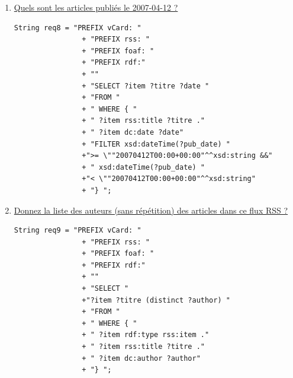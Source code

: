 \documentclass[12pt,a4paper]{article}
\begin{document}
\begin{justify}
\begin{enumerate}
            \item \underline{Quels sont les articles publiés le 2007-04-12 ?}
            \begin{verbatim}
String req8 = "PREFIX vCard: "
                + "PREFIX rss: "
                + "PREFIX foaf: "
                + "PREFIX rdf:"
                + ""
                + "SELECT ?item ?titre ?date "
                + "FROM "
                + " WHERE { "
                + " ?item rss:title ?titre ."
                + " ?item dc:date ?date"
                + "FILTER xsd:dateTime(?pub_date) "
                +">= \""20070412T00:00+00:00"^^xsd:string &&"
                + " xsd:dateTime(?pub_date) "
                +"< \""20070412T00:00+00:00"^^xsd:string"
                + "} ";
            \end{verbatim}
            \item \underline{Donnez la liste des auteurs (sans répétition) des articles dans ce flux RSS ?}
            \begin{verbatim}
String req9 = "PREFIX vCard: "
                + "PREFIX rss: "
                + "PREFIX foaf: "
                + "PREFIX rdf:"
                + ""
                + "SELECT "
                +"?item ?titre (distinct ?author) "
                + "FROM "
                + " WHERE { "
                + " ?item rdf:type rss:item ."
                + " ?item rss:title ?titre ."
                + " ?item dc:author ?author"
                + "} ";
            \end{verbatim}
        \end{enumerate}
    \end{justify}
\end{document}
